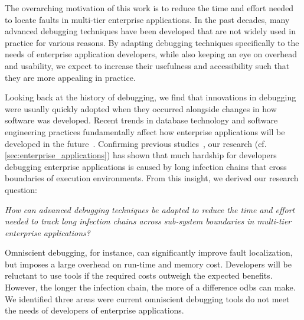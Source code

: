 \newcommand{\RQ}[1]{\subsection*{\textsl{#1}}}

The overarching motivation of this work is to reduce the time and effort needed to locate faults in multi-tier enterprise applications.
In the past decades, many advanced debugging techniques have been developed that are not widely used in practice for various reasons.
By adapting  debugging techniques specifically to the needs of enterprise application developers,
while also keeping an eye on overhead and usability, we expect to increase their usefulness and accessibility such that they are more appealing in practice.

Looking back at the history of debugging, we find that innovations in debugging were usually quickly adopted when they occurred alongside changes in how software was developed.
Recent trends in database technology and software engineering practices fundamentally affect how enterprise applications will be developed in the future~\cite{plattner15:the_in-memory_revolution_how}.
Confirming previous studies~\cite{eisenstadt97:my_hairiest_bug_war, perscheid17:studying_the_advancement}, our research (cf. \cref{sec:enterprise_applications}) has shown that much hardship for developers debugging enterprise applications is caused by long infection chains that cross boundaries of execution environments.
From this insight, we derived our research question:

\medskip
\noindent
\emph{How can advanced debugging techniques be adapted to reduce the time and effort needed to track long infection chains across sub-system boundaries in multi-tier enterprise applications?}
\medskip

\noindent
Omniscient debugging, for instance, can significantly improve fault localization, but imposes a large overhead on run-time and memory cost.
Developers will be reluctant to use tools if the required costs outweigh the expected benefits.
However, the longer the infection chain, the more of a difference \acfp{odb} can make.
We identified three areas were current omniscient debugging tools do not meet the needs of developers of enterprise applications.

